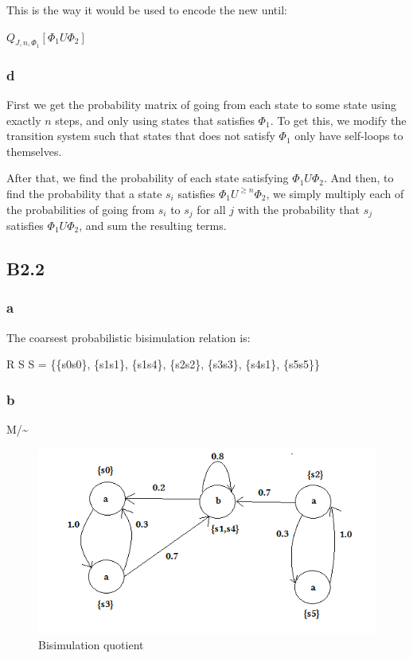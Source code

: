 This is the way it would be used to encode the new until:

$Q_{J, n, \Phi_1} [\Phi_1 U \Phi_2]$

\subsubsection{d}

First we get the probability matrix of going from each state to
some state using exactly $n$ steps,
and only using states that satisfies $\Phi_1$.
To get this, we modify the transition system such that states that does not satisfy
$\Phi_1$ only have self-loops to themselves.

After that, we find the probability of each state satisfying $\Phi_1 U \Phi_2$.
And then, to find the probability that a state $s_i$ satisfies $\Phi_1 U^{\geq n} \Phi_2$,
we simply multiply each of the probabilities of going from $s_i$ to $s_j$ for all $j$ with
the probability that $s_j$ satisfies $\Phi_1 U \Phi_2$, and sum the resulting terms.

\subsection{B2.2}

\subsubsection{a}
The coarsest probabilistic bisimulation relation is:

R \subseteq S \times S = \{\{s0s0\}, \{s1s1\}, \{s1s4\}, \{s2s2\}, \{s3s3\}, \{s4s1\}, \{s5s5\}\}

\subsubsection{b}
M/\sim

\begin{figure}[!htb]
\centering
\includegraphics{images/bisimulation}
\caption{Bisimulation quotient}
\end{figure}

